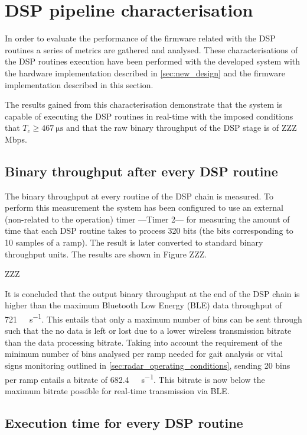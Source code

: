 \section{DSP pipeline characterisation} \label{sec:dsp_test}

In order to evaluate the performance of the firmware related with the DSP routines a series of metrics are gathered and analysed. These characterisations of the DSP routines execution have been performed with the developed system with the hardware implementation described in \cref{sec:new_design} and the firmware implementation described in this section.

The results gained from this characterisation demonstrate that the system is capable of executing the DSP routines in real-time with the imposed conditions that $T_c \ge \SI{467}{\micro\second}$ and that the raw binary throughput of the DSP stage is of ZZZ Mbps.

\subsection{Binary throughput after every DSP routine}

The binary throughput at every routine of the DSP chain is measured. To perform this measurement the system has been configured to use an external (non-related to the operation) timer ---Timer 2--- for measuring the amount of time that each DSP routine takes to process 320 bits (the bits corresponding to 10 samples of a ramp). The result is later converted to standard binary throughput units. The results are shown in Figure ZZZ.

ZZZ

It is concluded that the output binary throughput at the end of the DSP chain is higher than the maximum Bluetooth Low Energy (BLE) data throughput of \SI{721}{\kilo\bit\per\second}. This entails that only a maximum number of bins can be sent through such that the no data is left or lost due to a lower wireless transmission bitrate than the data processing bitrate. Taking into account the requirement of the minimum number of bins analysed per ramp needed for gait analysis or vital signs monitoring outlined in \cref{sec:radar_operating_conditions}, sending 20 bins per ramp entails a bitrate of \SI{682.4}{\kilo\bit\per\second}. This bitrate is now below the maximum bitrate possible for real-time transmission via BLE.

\subsection{Execution time for every DSP routine}

